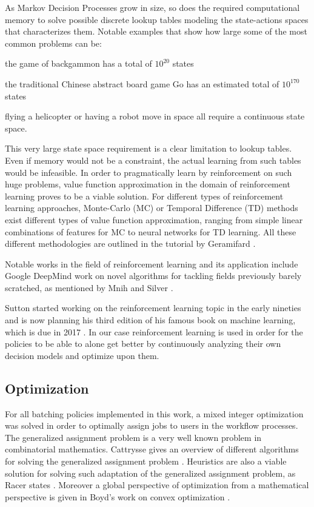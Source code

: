 \documentclass{seal_thesis}
\begin{document}
As Markov Decision Processes grow in size, so does the required computational memory to solve possible discrete lookup tables modeling the state-actions spaces that characterizes them. Notable examples that show how large some of the most common problems can be:
\begin{enumerate*}
	\item the game of backgammon has a total of $10^{20}$ states
	\item the traditional Chinese abstract board game Go has an estimated total of $10^{170}$ states
	\item flying a helicopter or having a robot move in space all require a continuous state space.
\end{enumerate*}

This very large state space requirement is a clear limitation to lookup tables. Even if memory would not be a constraint, the actual learning from such tables would be infeasible. In order to pragmatically learn by reinforcement on such huge problems, value function approximation in the domain of reinforcement learning proves to be a viable solution. For different types of reinforcement learning approaches, \ie Monte-Carlo (MC) or Temporal Difference (TD) methods exist different types of value function approximation, ranging from simple linear combinations of features for MC to neural networks for TD learning. All these different methodologies are outlined in the tutorial by Geramifard \cite{Geramifard2013}.

Notable works in the field of reinforcement learning and its application include Google DeepMind work on novel algorithms for tackling fields previously barely scratched, as mentioned by Mnih \etal and Silver \etal \cite{Mnih2015,Silver2016}.

Sutton started working on the reinforcement learning topic in the early nineties and is now planning his third edition of his famous book on machine learning, which is due in 2017 \cite{Sutton1998}. In our case reinforcement learning is used in order for the policies to be able to alone get better by continuously analyzing their own decision models and optimize upon them.

\subsection{Optimization}

For all batching policies implemented in this work, a mixed integer optimization was solved in order to optimally assign jobs to users in the workflow processes. The generalized assignment problem is a very well known problem in combinatorial mathematics. Cattrysse gives an overview of different algorithms for solving the generalized assignment problem \cite{Cattrysse1992}. Heuristics are also a viable solution for solving such adaptation of the generalized assignment problem, as Racer states \cite{Racer1994}. Moreover a global perspective of optimization from a mathematical perspective is given in Boyd's work on convex optimization \cite{Boyd2004}.
\end{document}
